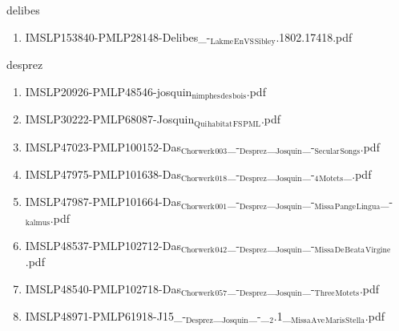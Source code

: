 \documentclass[11pt]{article}
\begin{document}
\item delibes
\label{sec-1-1-1-1-44-24}
\begin{enumerate}
\item IMSLP153840-PMLP28148-Delibes\_-$_{\text{Lakme}}$$_{\text{EnVS}}$$_{\text{Sibley}}$.1802.17418.pdf
\label{sec-1-1-1-1-44-24-1}
\end{enumerate}

\item desprez
\label{sec-1-1-1-1-44-25}
\begin{enumerate}
\item IMSLP20926-PMLP48546-josquin$_{\text{nimphes}}$$_{\text{des}}$$_{\text{bois}}$.pdf
\label{sec-1-1-1-1-44-25-1}

\item IMSLP30222-PMLP68087-Josquin$_{\text{Qui}}$$_{\text{habitat}}$$_{\text{FS}}$$_{\text{PML}}$.pdf
\label{sec-1-1-1-1-44-25-2}

\item IMSLP47023-PMLP100152-Das$_{\text{Chorwerk}}$$_{\text{003}}$\_-$_{\text{Desprez}}$\_$_{\text{Josquin}}$\_-$_{\text{Secular}}$$_{\text{Songs}}$.pdf
\label{sec-1-1-1-1-44-25-3}

\item IMSLP47975-PMLP101638-Das$_{\text{Chorwerk}}$$_{\text{018}}$\_-$_{\text{Desprez}}$\_$_{\text{Josquin}}$\_-$_{\text{4}}$$_{\text{Motets}}$\_.pdf
\label{sec-1-1-1-1-44-25-4}

\item IMSLP47987-PMLP101664-Das$_{\text{Chorwerk}}$$_{\text{001}}$\_-$_{\text{Desprez}}$\_$_{\text{Josquin}}$\_-$_{\text{Missa}}$$_{\text{Pange}}$$_{\text{Lingua}}$\_-$_{\text{kalmus}}$.pdf
\label{sec-1-1-1-1-44-25-5}

\item IMSLP48537-PMLP102712-Das$_{\text{Chorwerk}}$$_{\text{042}}$\_-$_{\text{Desprez}}$\_$_{\text{Josquin}}$\_-$_{\text{Missa}}$$_{\text{De}}$$_{\text{Beata}}$$_{\text{Virgine}}$.pdf
\label{sec-1-1-1-1-44-25-6}

\item IMSLP48540-PMLP102718-Das$_{\text{Chorwerk}}$$_{\text{057}}$\_-$_{\text{Desprez}}$\_$_{\text{Josquin}}$\_-$_{\text{Three}}$$_{\text{Motets}}$.pdf
\label{sec-1-1-1-1-44-25-7}

\item IMSLP48971-PMLP61918-J15\_-$_{\text{Desprez}}$\_$_{\text{Josquin}}$\_-\_$_{\text{2}}$.1\_$_{\text{Missa}}$$_{\text{Ave}}$$_{\text{Maris}}$$_{\text{Stella}}$.pdf
\label{sec-1-1-1-1-44-25-8}


\end{enumerate}
\end{document}
